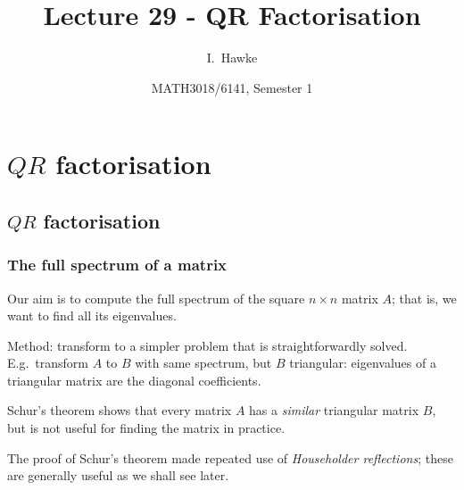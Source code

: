 \documentclass{beamer}
\title[Lecture 29] %
{Lecture 29 - QR Factorisation}
\author[I. Hawke] %
{I.~Hawke}
\institute[University of Southampton] %
{
  School of Mathematics, \\
  University of Southampton, UK
}
\date[Semester 1] %
{MATH3018/6141, Semester 1}
\begin{document}
\begin{frame}
  \titlepage
\end{frame}


\section{\texorpdfstring{$QR$ factorisation}{QR factorisation}}

\subsection{\texorpdfstring{$QR$ factorisation}{QR factorisation}}

\begin{frame}
  \frametitle{The full spectrum of a matrix}

  Our aim is to compute the full spectrum of the square $n \times n$
  matrix $A$; that is, we want to find all its eigenvalues. \pause

  \vspace{1ex}

  Method: transform to a simpler problem that is straightforwardly
  solved. E.g.\ transform $A$ to $B$ with same spectrum, but $B$
  triangular: eigenvalues of a triangular matrix are the diagonal
  coefficients. \pause

  \vspace{1ex}

  Schur's theorem shows that every matrix $A$ has a \emph{similar}
  triangular matrix $B$, but is not useful for finding the matrix in
  practice. \pause

  \vspace{1ex}

  The proof of Schur's theorem made repeated use of \emph{Householder
    reflections}; these are generally useful as we shall see later.

\end{frame}
\end{document}

